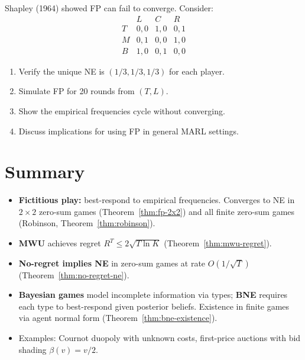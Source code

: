\documentclass[11pt,a4paper]{article}
\begin{document}
\begin{exercise}
\label{ex:fp-shapley}
Shapley (1964) showed FP can fail to converge. Consider:
\[
\begin{array}{c|ccc}
  & L & C & R \\ \hline
T & 0,0 & 1,0 & 0,1 \\
M & 0,1 & 0,0 & 1,0 \\
B & 1,0 & 0,1 & 0,0
\end{array}
\]
\begin{enumerate}[label=(\alph*)]
    \item Verify the unique NE is $(1/3,1/3,1/3)$ for each player.
    \item Simulate FP for 20 rounds from $(T,L)$.
    \item Show the empirical frequencies cycle without converging.
    \item Discuss implications for using FP in general MARL settings.
\end{enumerate}
\end{exercise}


\section{Summary}
\label{sec:summary}

\begin{itemize}
    \item \textbf{Fictitious play:} best-respond to empirical
    frequencies. Converges to NE in $2 \times 2$ zero-sum games
    (Theorem~\ref{thm:fp-2x2}) and all finite zero-sum games
    (Robinson, Theorem~\ref{thm:robinson}).
    \item \textbf{MWU} achieves regret
    $R^T \leq 2\sqrt{T\ln K}$ (Theorem~\ref{thm:mwu-regret}).
    \item \textbf{No-regret implies NE} in zero-sum games at rate
    $O(1/\sqrt{T})$ (Theorem~\ref{thm:no-regret-ne}).
    \item \textbf{Bayesian games} model incomplete information via types;
    \textbf{BNE} requires each type to best-respond given posterior
    beliefs. Existence in finite games via agent normal form
    (Theorem~\ref{thm:bne-existence}).
    \item Examples: Cournot duopoly with unknown costs, first-price
    auctions with bid shading $\beta(v) = v/2$.
\end{itemize}
\end{document}

